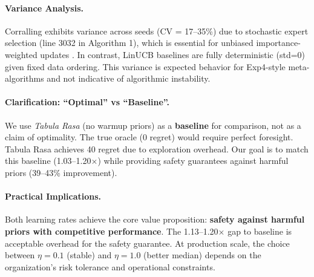 \begin{table}[t]
\paragraph{Variance Analysis.}
Corralling exhibits variance across seeds (CV = 17--35\%) due to stochastic expert selection (line 3032 in Algorithm 1), which is essential for unbiased importance-weighted updates \citep{agarwal2017corralling}. In contrast, LinUCB baselines are fully deterministic (std=0) given fixed data ordering. This variance is expected behavior for Exp4-style meta-algorithms and not indicative of algorithmic instability.

\paragraph{Clarification: ``Optimal'' vs ``Baseline''.}
We use \emph{Tabula Rasa} (no warmup priors) as a \textbf{baseline} for comparison, not as a claim of optimality. The true oracle (0 regret) would require perfect foresight. Tabula Rasa achieves 40 regret due to exploration overhead. Our goal is to match this baseline (1.03--1.20$\times$) while providing safety guarantees against harmful priors (39--43\% improvement).

\paragraph{Practical Implications.}
Both learning rates achieve the core value proposition: \textbf{safety against harmful priors with competitive performance}. The 1.13--1.20$\times$ gap to baseline is acceptable overhead for the safety guarantee. At production scale, the choice between $\eta=0.1$ (stable) and $\eta=1.0$ (better median) depends on the organization's risk tolerance and operational constraints.

\end{table}

